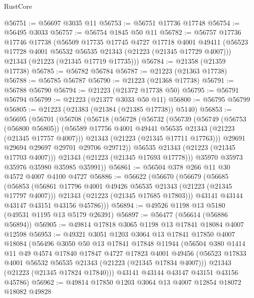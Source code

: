 \begin{lexlean}{RustCore}
\begin{coremodule}
@56751 := @56697 @3035 @11
@56753 := @56751 @17736 @17748
@56754 := @56495 @3033
@56757 := @56754 @1845 @50 @11
@56782 := @56757
    @17736
    @17746
    @17738
    (@56509
      @17735
      @17745
      @4727
      @17718
      @4001
      @49411
      (@56523 @17728 @4001 @56532 @56535 @21343 (@21223 (@21345 @17729 @4007)))
      @21343
      (@21223 (@21345 @17719 @17735)))
@56784 := @21358 (@21359 @17738)
@56785 := @56782 @56784
@56787 := @21223 (@21363 @17738)
@56788 := @56785 @56787
@56790 := @21223 (@21368 @17738)
@56791 := @56788 @56790
@56794 := @21223 (@21372 @17738 @50)
@56795 := @56791 @56794
@56799 := @21223 (@21377 @3033 @50 @11)
@56800 := @56795 @56799
@56805 := @21223 (@21383 (@21384 (@21385 @17738)) @5140)
@56853 := @56695
    (@56701
      (@56708
        (@56718
          (@56728
            (@56732
              (@56739
                (@56749
                  (@56753 (@56800 @56805))
                  (@56589 @17756 @4001 @49441 @56535 @21343 (@21223 (@21345 @17757 @4007)))
                  @21343
                  (@21223 (@21345 @17711 @17763)))
                @29691
                @29694
                @29697
                @29701
                @29706
                @29712))
            @56535
            @21343
            (@21223 (@21345 @17703 @4007)))
          @21343
          (@21223 (@21345 @17693 @17778)))
        @35970
        @35973
        @35976
        @35980
        @35985
        @35991))
@56861 := @56504 @378 @266 @11 @30 @4572 @4007 @4100 @4727
@56886 := @56622
    (@56670
      (@56679
        (@56685
          (@56853
            (@56861 @17796 @4001 @49426 @56535 @21343 (@21223 (@21345 @17797 @4007)))
            @21343
            (@21223 (@21345 @17685 @17803)))
          @43141
          @43144
          @43147
          @43151
          @43156
          @45786)))
@56894 := @49526 @1198 @13 @5180 (@49531 @1195 @13 @5179 @26391)
@56897 := @56477 (@56614 (@56886 @56894))
@56905 := @49814 @17818 @3065 @1198 @13 @17841 @18084 @4007 @12598
@56953 := @49321
    @3051
    @1203
    @3064
    @13
    @17841
    @17850
    @4007
    @18084
    (@56496
      @3050
      @50
      @13
      @17841
      @17848
      @11944
      (@56504
        @380
        @1414
        @11
        @49
        @4574
        @17840
        @17847
        @4727
        @17823
        @4001
        @49456
        (@56523 @17833 @4001 @56532 @56535 @21343 (@21223 (@21345 @17834 @4007)))
        @21343
        (@21223 (@21345 @17824 @17840)))
      @43141
      @43144
      @43147
      @43151
      @43156
      @45786)
@56962 := @49814 @17850 @1203 @3064 @13 @4007 @12854 @18072 @18082 @49828

\end{coremodule}
\end{lexlean}
